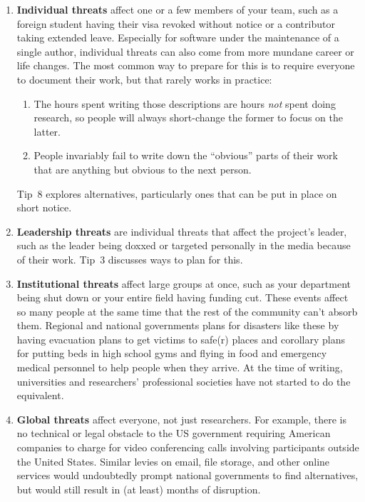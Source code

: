 \documentclass[10pt,letterpaper]{article}
\begin{document}
\begin{enumerate}
\item
  \textbf{Individual threats} affect one or a few members of your team,
  such as a foreign student having their visa revoked without notice
  or a contributor taking extended leave.
  Especially for software under the maintenance of a single author,
  individual threats can also come from more mundane career or life changes.
  The most common way to prepare for this is to require everyone to document their work,
  but that rarely works in practice:
  \begin{enumerate}
  \item
    The hours spent writing those descriptions are hours \emph{not} spent doing research,
    so people will always short-change the former to focus on the latter.
  \item
    People invariably fail to write down the ``obvious'' parts of their work
    that are anything but obvious to the next person.
  \end{enumerate}
  Tip~8 explores alternatives,
  particularly ones that can be put in place on short notice.

\item
  \textbf{Leadership threats} are individual threats that affect the project's leader,
  such as the leader being doxxed or targeted personally in the media because of their work.
  Tip~3 discusses ways to plan for this.

\item
  \textbf{Institutional threats} affect large groups at once,
  such as your department being shut down
  or your entire field having funding cut.
  These events affect so many people at the same time
  that the rest of the community can't absorb them.
  Regional and national governments plans for disasters like these
  by having evacuation plans to get victims to safe(r) places
  and corollary plans for putting beds in high school gyms
  and flying in food and emergency medical personnel to help people when they arrive.
  At the time of writing,
  universities and researchers' professional societies have not started to do the equivalent.

\item
  \textbf{Global threats} affect everyone,
  not just researchers.
  For example,
  there is no technical or legal obstacle to the US government
  requiring American companies to charge for video conferencing calls
  involving participants outside the United States.
  Similar levies on email,
  file storage,
  and other online services would undoubtedly prompt national governments to find alternatives,
  but would still result in (at least) months of disruption.

\end{enumerate}
\end{document}
